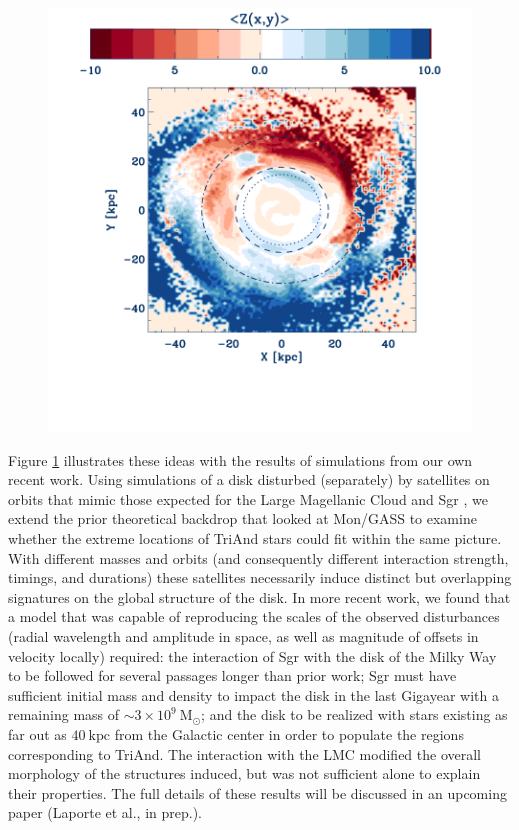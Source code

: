 \documentclass[galaxies,article,submit,moreauthors,pdftex,10pt,a4paper]{mdpi}
\newcommand{\kpc}{\mathrm{kpc}}
\newcommand{\msun}{\mathrm{M}_\odot}
\begin{document}
\begin{figure}[ht!]
\centering
\includegraphics[width=5 in]{figures/simulation.pdf}
\caption{\label{fig:chervin}
}
\end{figure}

Figure \ref{fig:chervin} illustrates these ideas with the results of simulations from our own recent work.
Using simulations of a disk disturbed (separately) by satellites on orbits that
mimic those expected for the Large Magellanic Cloud and Sgr \cite{laporte17a}, we
extend the prior theoretical backdrop that looked at Mon/GASS to examine whether
the extreme locations of TriAnd stars could fit within the same picture.
With different masses and orbits (and consequently different interaction
strength, timings, and durations) these satellites necessarily induce distinct
but overlapping signatures on the global structure of the disk.
In more recent work, we found that a model that was capable of reproducing the scales of the observed disturbances (radial wavelength and amplitude in space, as well as magnitude of offsets in velocity locally) required:
the interaction of Sgr with the disk of the Milky Way to be followed for several passages longer than prior work;
Sgr must have sufficient initial mass and density to impact the disk in the last Gigayear with a remaining mass of $\sim3\times10^{9}~\msun$;
and the disk to be realized with stars existing as far out as $40~\kpc$ from the Galactic center in order to populate the regions corresponding to TriAnd.
The interaction with the LMC modified the overall morphology of the structures induced, but was not sufficient alone to explain their properties.
The full details of these results will be discussed in an upcoming paper (Laporte et al., in prep.).
\end{document}
